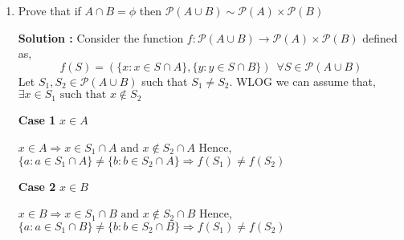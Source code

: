 \documentclass[10pt]{article}
\newcommand{\nn}{\mathbb{N}}
\newcommand{\p}{\mathcal{P}}
\begin{document}
\begin{enumerate}
	    \textbf{Solution : }Let's assume $S$ is an infinite set. Let $A \subset S$ be countable.
	    We know such a subset exists because, every infinite set has a countable subset. Then,
	    the set $A$ can be written as $A = \{ a_1, a_2, \dots \}$. Let us split thus sets into two sets $A_1$ and $A_2$, as
	    $A_1 = \{ a_1, a_3, \dots \}$ and $A_2 = \{ a_2, a_4, \dots \}$. Now, let us consider the function $f: S \to S \setminus A_1$ defined as,
	    \begin{equation*}
		    f(x) = 
		    \begin{cases}
			    x & \text{ if } x \in S \setminus A \\
			    a_{2n} & \text{ if } x = a_n \in A
		    \end{cases}
	    \end{equation*}
	    $f$ can be shown to be a bijection and hence, $S \sim S\setminus A_1 \subset S$

	    Now, let us assume that $S$ is equipotent to a proper subset of itself. We shall show that
	    $S$ is ininite. Let's assume to the contrary that, $S$ is finite. Then, Let $S$ have $n \in \nn$ elements. Then
	    any proper subset of $S$ has $m \in \nn$ elements with $m < n$. Then, it is impossible to find a bijection between them
	    since, for a bijection to exist between two finite sets, the number of elements in the sets must be equal. But, this is a contradiction.
	    Hence, $S$ must be inifinte. \qed


    \item Prove that if $A \cap B = \phi$ then $\p(A \cup B) \sim \p(A) \times \p(B)$

	    \textbf{Solution : }Consider the function $f : \p(A \cup B) \to \p(A) \times \p(B)$ defined as,
	    $$f(S) = (\{ x : x \in S \cap A \},\{ y : y \in S \cap B \}) \,\,\, \forall S \in \p(A \cup B)$$
	    Let $S_1, S_2 \in \p(A \cup B)$ such that $S_1 \neq S_2$. WLOG we can assume that, $\exists x \in S_1 \text{ such that } x \notin S_2$

	    \textbf{Case 1 }$x \in A$ 

    $x \in A \Rightarrow x \in S_1 \cap A \text{ and } x \notin S_2 \cap A$
    Hence, $\{a : a \in S_1 \cap A \} \neq \{ b : b \in S_2 \cap A \} \Rightarrow f(S_1) \neq f(S_2)$

	    \textbf{Case 2 }$x \in B$ 

    $x \in B \Rightarrow x \in S_1 \cap B \text{ and } x \notin S_2 \cap B$
    Hence, $\{a : a \in S_1 \cap B \} \neq \{ b : b \in S_2 \cap B \} \Rightarrow f(S_1) \neq f(S_2)$


\end{enumerate}
\end{document}
